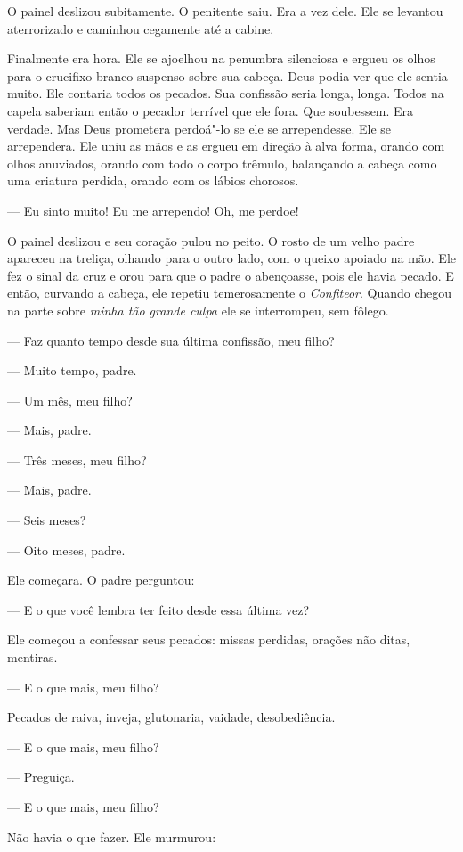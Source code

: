 O painel deslizou subitamente. O penitente saiu. Era a vez dele. Ele se
levantou aterrorizado e caminhou cegamente até a cabine.

Finalmente era hora. Ele se ajoelhou na penumbra silenciosa e ergueu os
olhos para o crucifixo branco suspenso sobre sua cabeça. Deus podia ver
que ele sentia muito. Ele contaria todos os pecados. Sua confissão
seria longa, longa. Todos na capela saberiam então o pecador terrível
que ele fora. Que soubessem. Era verdade. Mas Deus prometera perdoá"-lo
se ele se arrependesse. Ele se arrependera. Ele uniu as mãos e as
ergueu em direção à alva forma, orando com olhos anuviados, orando com
todo o corpo trêmulo, balançando a cabeça como uma criatura perdida,
orando com os lábios chorosos.

 --- Eu sinto muito! Eu me arrependo! Oh, me perdoe!

O painel deslizou e seu coração pulou no peito. O rosto de um velho
padre apareceu na treliça, olhando para o outro lado, com o queixo
apoiado na mão. Ele fez o sinal da cruz e orou para que o padre o
abençoasse, pois ele havia pecado. E então, curvando a cabeça, ele
repetiu temerosamente o \textit{Confiteor}. Quando chegou na parte
sobre \textit{minha tão grande culpa} ele se interrompeu, sem fôlego.

 --- Faz quanto tempo desde sua última confissão, meu filho?

 --- Muito tempo, padre.

 --- Um mês, meu filho?

 --- Mais, padre.

 --- Três meses, meu filho?

 --- Mais, padre.

 --- Seis meses?

 --- Oito meses, padre.

Ele começara. O padre perguntou:

 --- E o que você lembra ter feito desde essa última vez?

Ele começou a confessar seus pecados: missas perdidas, orações não
ditas, mentiras.

 --- E o que mais, meu filho?

Pecados de raiva, inveja, glutonaria, vaidade, desobediência.

 --- E o que mais, meu filho?

 --- Preguiça.

 --- E o que mais, meu filho?

Não havia o que fazer. Ele murmurou:

